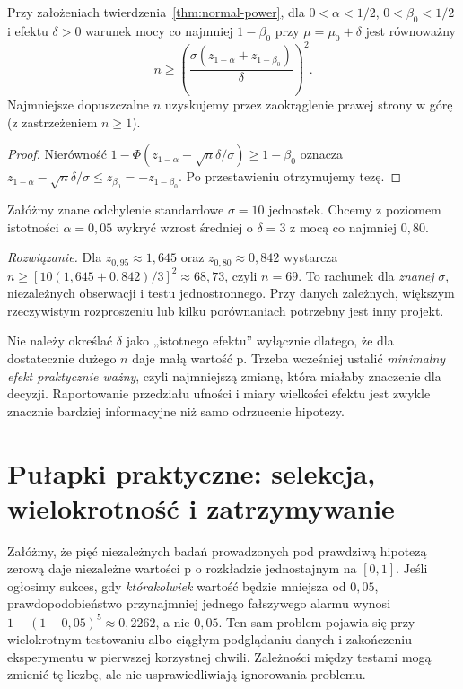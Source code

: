\begin{wniosek}
\label{cor:normal-sample-size}
Przy założeniach twierdzenia~\ref{thm:normal-power}, dla
$0<\alpha<1/2$, $0<\beta_0<1/2$ i efektu $\delta>0$
warunek mocy co najmniej $1-\beta_0$ przy $\mu=\mu_0+\delta$
jest równoważny
\[
 n\ge\left(\frac{\sigma(z_{1-\alpha}+z_{1-\beta_0})}
 {\delta}\right)^2.
\]
Najmniejsze dopuszczalne $n$ uzyskujemy przez
zaokrąglenie prawej strony w górę (z zastrzeżeniem $n\ge1$).
\end{wniosek}
\begin{proof}
Nierówność $1-\Phi(z_{1-\alpha}-\sqrt n\delta/\sigma)
\ge1-\beta_0$ oznacza
$z_{1-\alpha}-\sqrt n\delta/\sigma\le z_{\beta_0}
=-z_{1-\beta_0}$. Po przestawieniu otrzymujemy tezę.
\end{proof}

\begin{zadanie}
Załóżmy znane odchylenie standardowe $\sigma=10$ jednostek.
Chcemy z poziomem istotności $\alpha=0{,}05$ wykryć wzrost
średniej o $\delta=3$ z mocą co najmniej $0{,}80$.
\par\emph{Rozwiązanie.} Dla $z_{0{,}95}\approx1{,}645$
oraz $z_{0{,}80}\approx0{,}842$ wystarcza
$n\ge[10(1{,}645+0{,}842)/3]^2\approx68{,}73$,
czyli $n=69$. To rachunek dla \emph{znanej} $\sigma$,
niezależnych obserwacji i testu jednostronnego. Przy danych
zależnych, większym rzeczywistym rozproszeniu lub kilku
porównaniach potrzebny jest inny projekt.
\end{zadanie}

Nie należy określać $\delta$ jako „istotnego efektu” wyłącznie
dlatego, że dla dostatecznie dużego $n$ daje małą wartość p.
Trzeba wcześniej ustalić \emph{minimalny efekt praktycznie ważny},
czyli najmniejszą zmianę, która miałaby znaczenie dla decyzji.
Raportowanie przedziału ufności i miary wielkości efektu jest
zwykle znacznie bardziej informacyjne niż samo odrzucenie hipotezy.

\section{Pułapki praktyczne: selekcja, wielokrotność i zatrzymywanie}
\begin{przyklad}
Załóżmy, że pięć niezależnych badań prowadzonych pod prawdziwą
hipotezą zerową daje niezależne wartości p o rozkładzie
jednostajnym na $[0,1]$. Jeśli ogłosimy sukces, gdy
\emph{którakolwiek} wartość będzie mniejsza od $0{,}05$,
prawdopodobieństwo przynajmniej jednego fałszywego alarmu wynosi
$1-(1-0{,}05)^5\approx0{,}2262$, a nie $0{,}05$.
Ten sam problem pojawia się przy wielokrotnym testowaniu albo
ciągłym podglądaniu danych i zakończeniu eksperymentu w
pierwszej korzystnej chwili. Zależności między testami mogą
zmienić tę liczbę, ale nie usprawiedliwiają ignorowania problemu.
\end{przyklad}

